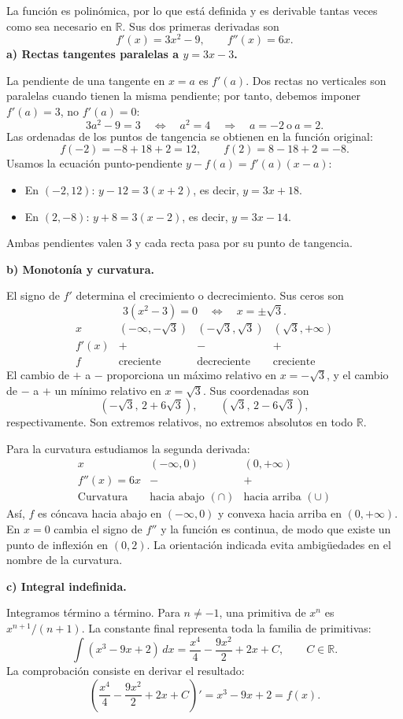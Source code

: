 La función es polinómica, por lo que está definida y es derivable tantas veces como sea necesario en $\mathbb R$. Sus dos primeras derivadas son
\[
f'(x)=3x^2-9,\qquad f''(x)=6x.
\]
\textbf{a) Rectas tangentes paralelas a $y=3x-3$.}

La pendiente de una tangente en $x=a$ es $f'(a)$. Dos rectas no verticales son paralelas cuando tienen la misma pendiente; por tanto, debemos imponer $f'(a)=3$, no $f'(a)=0$:
\[
3a^2-9=3\quad\Longleftrightarrow\quad a^2=4
\quad\Longrightarrow\quad a=-2\ \text{o}\ a=2.
\]
Las ordenadas de los puntos de tangencia se obtienen en la función original:
\[
f(-2)=-8+18+2=12,\qquad f(2)=8-18+2=-8.
\]
Usamos la ecuación punto-pendiente $y-f(a)=f'(a)(x-a)$:
\begin{itemize}
\item En $(-2,12)$: $y-12=3(x+2)$, es decir, $\boxed{y=3x+18}$.
\item En $(2,-8)$: $y+8=3(x-2)$, es decir, $\boxed{y=3x-14}$.
\end{itemize}
Ambas pendientes valen 3 y cada recta pasa por su punto de tangencia.

\textbf{b) Monotonía y curvatura.}

El signo de $f'$ determina el crecimiento o decrecimiento. Sus ceros son
\[
3(x^2-3)=0\quad\Longleftrightarrow\quad x=\pm\sqrt3.
\]
\[
\begin{array}{c|ccc}
x&(-\infty,-\sqrt3)&(-\sqrt3,\sqrt3)&(\sqrt3,+\infty)\\\hline
f'(x)&+&-&+\\
f&\text{creciente}&\text{decreciente}&\text{creciente}
\end{array}
\]
El cambio de $+$ a $-$ proporciona un máximo relativo en $x=-\sqrt3$, y el cambio de $-$ a $+$ un mínimo relativo en $x=\sqrt3$. Sus coordenadas son
\[
\left(-\sqrt3,\,2+6\sqrt3\right),\qquad
\left(\sqrt3,\,2-6\sqrt3\right),
\]
respectivamente. Son extremos relativos, no extremos absolutos en todo $\mathbb R$.

Para la curvatura estudiamos la segunda derivada:
\[
\begin{array}{c|cc}
x&(-\infty,0)&(0,+\infty)\\\hline
f''(x)=6x&-&+\\
\text{Curvatura}&\text{hacia abajo }(\cap)&\text{hacia arriba }(\cup)
\end{array}
\]
Así, $f$ es cóncava hacia abajo en $(-\infty,0)$ y convexa hacia arriba en $(0,+\infty)$. En $x=0$ cambia el signo de $f''$ y la función es continua, de modo que existe un punto de inflexión en $\boxed{(0,2)}$. La orientación indicada evita ambigüedades en el nombre de la curvatura.

\textbf{c) Integral indefinida.}

Integramos término a término. Para $n\ne-1$, una primitiva de $x^n$ es $x^{n+1}/(n+1)$. La constante final representa toda la familia de primitivas:
\[
\boxed{\int (x^3-9x+2)\,dx=\frac{x^4}{4}-\frac{9x^2}{2}+2x+C,\qquad C\in\mathbb R.}
\]
La comprobación consiste en derivar el resultado:
\[
\left(\frac{x^4}{4}-\frac{9x^2}{2}+2x+C\right)'=x^3-9x+2=f(x).
\]
